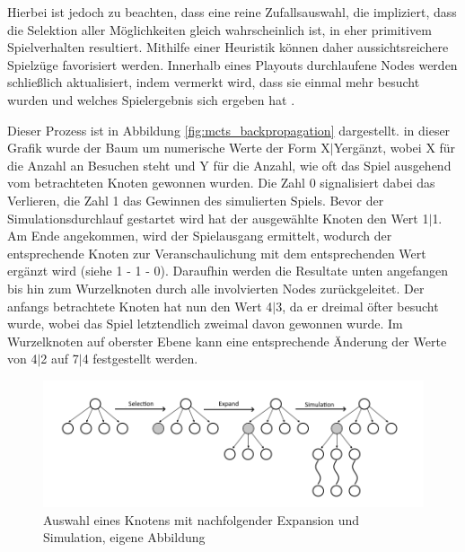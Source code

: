 \documentclass[12pt,a4paper]{article}
\begin{document}
Hierbei ist jedoch zu beachten, dass eine reine Zufallsauswahl, die impliziert, dass die Selektion aller Möglichkeiten gleich wahrscheinlich ist, in eher primitivem Spielverhalten resultiert. Mithilfe einer Heuristik können daher aussichtsreichere Spielzüge favorisiert werden. Innerhalb eines Playouts durchlaufene Nodes werden schließlich aktualisiert, indem vermerkt wird, dass sie einmal mehr besucht wurden und welches Spielergebnis sich ergeben hat \cite{Chaslot2008}.

Dieser Prozess ist in Abbildung \ref{fig:mcts_backpropagation} dargestellt. in dieser Grafik wurde der Baum um numerische Werte der Form \glqq{}X$|$Y\grqq  ergänzt, wobei X für die Anzahl an Besuchen steht und Y für die Anzahl, wie oft das Spiel ausgehend vom betrachteten Knoten gewonnen wurden. Die Zahl \glqq{}0\grqq{} signalisiert dabei das Verlieren, die Zahl \glqq{}1\grqq{} das Gewinnen des simulierten Spiels. Bevor der Simulationsdurchlauf gestartet wird hat der ausgewählte Knoten den Wert \glqq{}1$|$1\grqq{}. Am Ende angekommen, wird der Spielausgang ermittelt, wodurch der entsprechende Knoten zur Veranschaulichung mit dem entsprechenden Wert ergänzt wird (siehe \glqq{}1\grqq{} - \glqq{}1\grqq{} - \glqq{}0\grqq). Daraufhin werden die Resultate unten angefangen bis hin zum Wurzelknoten durch alle involvierten Nodes zurückgeleitet. Der anfangs betrachtete Knoten hat nun den Wert \glqq{}4$|$3\grqq{}, da er dreimal öfter besucht wurde, wobei das Spiel letztendlich zweimal davon gewonnen wurde. Im Wurzelknoten auf oberster Ebene kann eine entsprechende Änderung der Werte von \glqq{}4$|$2\grqq{} auf \glqq{}7$|$4\grqq{} festgestellt werden.

\begin{figure}
\centering
\includegraphics[width=1.0\textwidth]{pics/SelectionExpandSimulation.png}	
\caption{Auswahl eines Knotens mit nachfolgender Expansion und Simulation, eigene Abbildung}
	\label{fig:mcts_exp_sim}
\end{figure}
\end{document}
